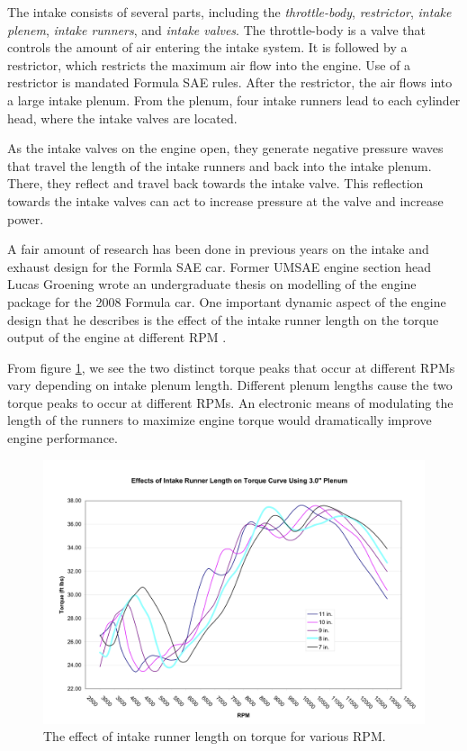 The intake consists of several parts, including the \emph{throttle-body}, \emph{restrictor}, \emph{intake plenem}, \emph{intake runners}, and \emph{intake valves}. The throttle-body is a valve that controls the amount of air entering the intake system. It is followed by a restrictor, which restricts the maximum air flow into the engine. Use of a restrictor is mandated Formula SAE rules. After the restrictor, the air flows into a large intake plenum. From the plenum, four intake runners lead to each cylinder head, where the intake valves are located.

As the intake valves on the engine open, they generate negative pressure waves that travel the length of the intake runners and back into the intake plenum. There, they reflect and travel back towards the intake valve. This reflection towards the intake valves can act to increase pressure at the valve and increase power.

A fair amount of research has been done in previous years on the intake and exhaust design for the Formla SAE car. Former UMSAE engine section head Lucas Groening wrote an undergraduate thesis on modelling of the engine package for the 2008 Formula car. One important dynamic aspect of the engine design that he describes is the effect of the intake runner length on the torque output of the engine at different RPM \cite{Modelingof20}. 

From figure \ref{fig:irl_effect}, we see the two distinct torque peaks that occur at different RPMs vary depending on intake plenum length. Different plenum lengths cause the two torque peaks to occur at different RPMs. An electronic means of modulating the length of the runners to maximize engine torque would dramatically improve engine performance.

\begin{figure}[H]
	\centering
	 	\includegraphics[scale=0.60]{figures/irl_effect.png}
    \caption{The effect of intake runner length on torque for various RPM.}
    \label{fig:irl_effect}
\end{figure}

